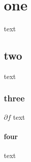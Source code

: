 \part{one}
	text
	\chapter{two}
	 text
	 \section{three}
	  $\partial f$
	  text
	  \subsection*{four}
		  text
